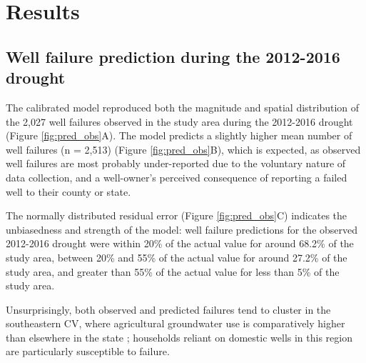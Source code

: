 \section{Results}

\subsection{Well failure prediction during the 2012-2016 drought}

The calibrated model reproduced both the magnitude and spatial distribution of the 2,027 well failures observed in the study area during the 2012-2016 drought (Figure \ref{fig:pred_obs}A). The model predicts a slightly higher mean number of well failures (n = 2,513) (Figure \ref{fig:pred_obs}B), which is expected, as observed well failures are most probably under-reported due to the voluntary nature of data collection, and a well-owner's perceived consequence of reporting a failed well to their county or state. 

The normally distributed residual error (Figure \ref{fig:pred_obs}C) indicates the unbiasedness and strength of the model: well failure predictions for the observed 2012-2016 drought were within 20\% of the actual value for around 68.2\% of the study area, between 20\% and 55\% of the actual value for around 27.2\% of the study area, and greater than 55\% of the actual value for less than 5\% of the study area. 

Unsurprisingly, both observed and predicted failures tend to cluster in the southeastern CV, where agricultural groundwater use is comparatively higher than elsewhere in the state \citep{Brush2013, Faunted.2009}; households reliant on domestic wells in this region are particularly susceptible to failure. 


